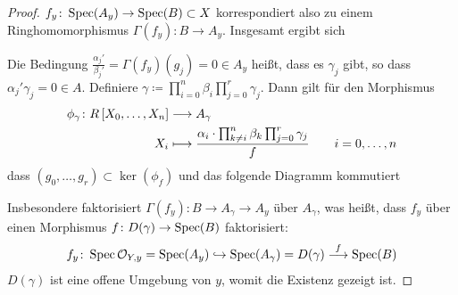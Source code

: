 \begin{Lemma}
\begin{proof}
    $f_y\colon\operatorname{Spec}(A_y)\to\operatorname{Spec}(B)\subset X$
    korrespondiert also zu einem Ringhomomorphismus
    $\Gamma(f_y)\colon B\to A_y$.
    Insgesamt ergibt sich
    \begin{center}
    \end{center}
    Die Bedingung $\frac{\alpha_j'}{\beta_j'}=\Gamma(f_y)(g_j)=0\in A_y$
    heißt, dass es $\gamma_j$ gibt, so dass
    $\alpha_j'\gamma_j=0\in A$.
    Definiere
    $\gamma\coloneqq \prod_{i=0}^n \beta_i \prod_{j=0}^r \gamma_j$.
    Dann gilt für den Morphismus
    \begin{align*}
      \phi_\gamma\colon
      R\left[X_0,\dotsc, X_n\right]
      &\longrightarrow
        A_\gamma\\
      X_i
      &\longmapsto
        \dfrac{
        \alpha_i\cdot
        \prod_{k\neq i}^n \beta_k
        \prod_{j=0}^r \gamma_j
        }{f}
        \qquad i=0,\dotsc,n
    \end{align*}
    dass $(g_0, \dotsc, g_r)\subset\ker(\phi_f)$ und das folgende
    Diagramm kommutiert
    \begin{center}
    \end{center}
    Insbesondere faktorisiert $\Gamma(f_y)\colon B\to A_\gamma\to A_y$
    über $A_\gamma$, was heißt, dass $f_y$ über einen Morphismus
    $f\colon D(\gamma)\to\operatorname{Spec}(B)$ faktorisiert:
    \begin{gather*}
      f_y\colon
      \operatorname{Spec}\mathcal{O}_{Y,y}=\operatorname{Spec}(A_y)
      \hookrightarrow \operatorname{Spec}(A_\gamma)=D(\gamma)
      \overset{f}{\longrightarrow} \operatorname{Spec}(B)
    \end{gather*}
    $D(\gamma)$ ist eine offene Umgebung von $y$, womit die Existenz
    gezeigt ist.
  \end{proof}
\end{Lemma}

